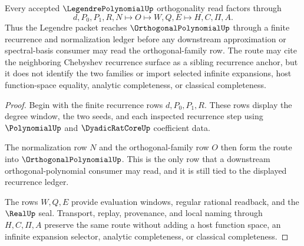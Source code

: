 \begin{theorem}
\label{thm:legendre-polynomial-orthogonal-route}
Every accepted $\LegendrePolynomialUp$ orthogonality read factors through
$$
d,P_0,P_1,R,N \longmapsto O \longmapsto W,Q,E \longmapsto H,C,\Pi,A .
$$
Thus the Legendre packet reaches $\OrthogonalPolynomialUp$ through a finite recurrence and normalization ledger before any downstream approximation or spectral-basis consumer may read the orthogonal-family row. The route may cite the neighboring Chebyshev recurrence surface as a sibling recurrence anchor, but it does not identify the two families or import selected infinite expansions, host function-space equality, analytic completeness, or classical completeness.
\end{theorem}
\begin{proof}
Begin with the finite recurrence rows $d,P_0,P_1,R$. These rows display the degree window, the two seeds, and each inspected recurrence step using $\PolynomialUp$ and $\DyadicRatCoreUp$ coefficient data.

The normalization row $N$ and the orthogonal-family row $O$ then form the route into $\OrthogonalPolynomialUp$. This is the only row that a downstream orthogonal-polynomial consumer may read, and it is still tied to the displayed recurrence ledger.

The rows $W,Q,E$ provide evaluation windows, regular rational readback, and the $\RealUp$ seal. Transport, replay, provenance, and local naming through $H,C,\Pi,A$ preserve the same route without adding a host function space, an infinite expansion selector, analytic completeness, or classical completeness.
\end{proof}



